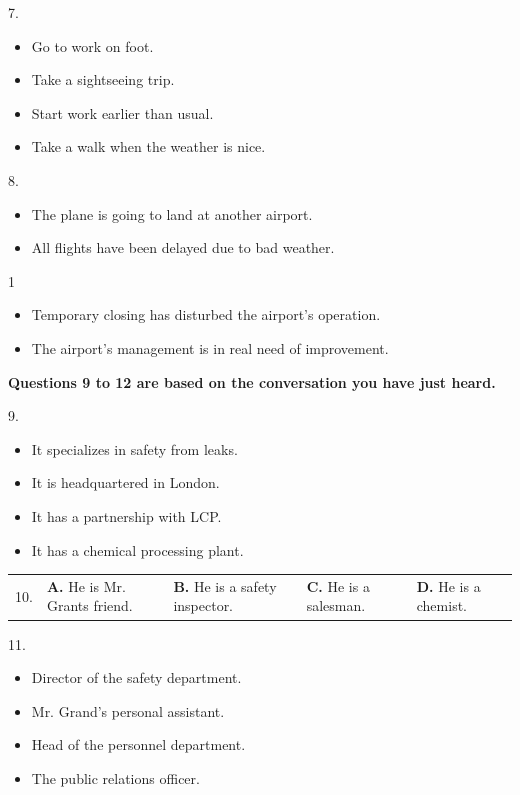 \documentclass[UTF8,11pt]{ctexart}
\begin{document}
7.


\begin{itemize}[leftmargin=2em,itemsep=.2em,topsep=.4em]\item[A.] Go to work on foot.
\item[B.] Take a sightseeing trip.
\item[C.] Start work earlier than usual.
\item[D.] Take a walk when the weather is nice.
\end{itemize}

8.


\begin{itemize}[leftmargin=2em,itemsep=.2em,topsep=.4em]\item[A.] The plane is going to land at another airport.
\item[B.] All flights have been delayed due to bad weather.
\end{itemize}

1


\begin{itemize}[leftmargin=2em,itemsep=.2em,topsep=.4em]\item[C.] Temporary closing has disturbed the airport’s operation.
\item[D.] The airport’s management is in real need of improvement.
\end{itemize}

\textbf{Questions 9 to 12 are based on the conversation you have just heard.}


9.


\begin{itemize}[leftmargin=2em,itemsep=.2em,topsep=.4em]\item[A.] It specializes in safety from leaks.
\item[B.] It is headquartered in London.
\item[C.] It has a partnership with LCP.
\item[D.] It has a chemical processing plant.
\end{itemize}

\noindent\begin{tabularx}{\linewidth}{@{}lXXXX@{}}10. & \textbf{A.} He is Mr. Grants friend. & \textbf{B.} He is a safety inspector. & \textbf{C.} He is a salesman. & \textbf{D.} He is a chemist.\\\end{tabularx}\par

11.


\begin{itemize}[leftmargin=2em,itemsep=.2em,topsep=.4em]\item[A.] Director of the safety department.
\item[B.] Mr. Grand’s personal assistant.
\item[C.] Head of the personnel department.
\item[D.] The public relations officer.
\end{itemize}
\end{document}
